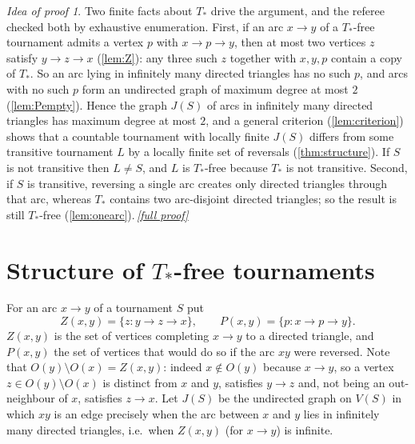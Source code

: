 \documentclass[11pt,a4paper]{article}
\theoremstyle{plain}
\theoremstyle{definition}
\theoremstyle{remark}
\newtheorem*{proofidea}{Idea of proof}
\newcommand{\fullproofref}[1]{\,\hyperref[#1]{\textit{[full proof]}}}
\newcommand{\Tstar}{T_{\ast}}
\begin{document}
\begin{proofidea}
Two finite facts about $\Tstar$ drive the argument, and the referee checked both by exhaustive enumeration. First, if an arc $x\to y$ of a $\Tstar$-free tournament admits a vertex $p$ with $x\to p\to y$, then at most two vertices $z$ satisfy $y\to z\to x$ (\cref{lem:Z}): any three such $z$ together with $x,y,p$ contain a copy of $\Tstar$. So an arc lying in infinitely many directed triangles has no such $p$, and arcs with no such $p$ form an undirected graph of maximum degree at most $2$ (\cref{lem:Pempty}). Hence the graph $J(S)$ of arcs in infinitely many directed triangles has maximum degree at most $2$, and a general criterion (\cref{lem:criterion}) shows that a countable tournament with locally finite $J(S)$ differs from some transitive tournament $L$ by a locally finite set of reversals (\cref{thm:structure}). If $S$ is not transitive then $L\ne S$, and $L$ is $\Tstar$-free because $\Tstar$ is not transitive. Second, if $S$ is transitive, reversing a single arc creates only directed triangles through that arc, whereas $\Tstar$ contains two arc-disjoint directed triangles; so the result is still $\Tstar$-free (\cref{lem:onearc}).\fullproofref{pf:main}
\end{proofidea}

\section{Structure of \texorpdfstring{$\Tstar$}{T*}-free tournaments}\label{sec:structure}

For an arc $x\to y$ of a tournament $S$ put
\[
 Z(x,y)=\{z: y\to z\to x\},\qquad P(x,y)=\{p: x\to p\to y\}.
\]
$Z(x,y)$ is the set of vertices completing $x\to y$ to a directed triangle, and $P(x,y)$ the set of vertices that would do so if the arc $xy$ were reversed. Note that $O(y)\setminus O(x)=Z(x,y)$: indeed $x\notin O(y)$ because $x\to y$, so a vertex $z\in O(y)\setminus O(x)$ is distinct from $x$ and $y$, satisfies $y\to z$ and, not being an out-neighbour of $x$, satisfies $z\to x$. Let $J(S)$ be the undirected graph on $V(S)$ in which $xy$ is an edge precisely when the arc between $x$ and $y$ lies in infinitely many directed triangles, i.e.\ when $Z(x,y)$ (for $x\to y$) is infinite.
\end{document}
